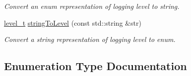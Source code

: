 \begin{DoxyCompactItemize}
\begin{DoxyCompactList}\small\item\em Convert an enum representation of logging level to string. \end{DoxyCompactList}\item 
\hyperlink{namespacedg_1_1deepcore_ac108b40b3a6b8e3450281eb787e27d6b}{level\+\_\+t} \hyperlink{group___utility_module_gafb8296927e835cd0399664adc12a5be8}{string\+To\+Level} (const std\+::string \&str)
\begin{DoxyCompactList}\small\item\em Convert a string representation of logging level to enum. \end{DoxyCompactList}\end{DoxyCompactItemize}


\subsection{Enumeration Type Documentation}
